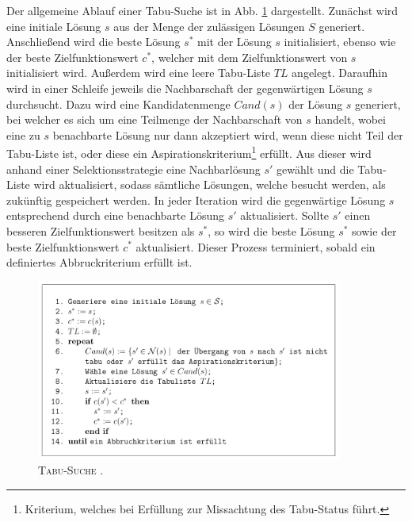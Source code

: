 Der allgemeine Ablauf einer Tabu-Suche ist in Abb. \ref{fig:tabu_search_algo}
dargestellt. Zunächst wird eine initiale Lösung $s$ aus der Menge der zulässigen Lösungen $S$ generiert.
Anschließend wird die beste Lösung $s^*$ mit der Lösung $s$ initialisiert, ebenso wie der beste Zielfunktionswert
$c^*$, welcher mit dem Zielfunktionswert von $s$ initialisiert wird. Außerdem wird eine leere Tabu-Liste $TL$
angelegt. Daraufhin wird in einer Schleife jeweils die Nachbarschaft der gegenwärtigen Lösung $s$ durchsucht. Dazu wird eine
Kandidatenmenge $Cand(s)$ der Lösung $s$ generiert, bei welcher es sich um eine Teilmenge der Nachbarschaft von $s$
handelt, wobei eine zu $s$ benachbarte Lösung nur dann akzeptiert wird, wenn diese nicht Teil der Tabu-Liste ist,
oder diese ein Aspirationskriterium\footnote{Kriterium, welches bei Erfüllung zur Missachtung des Tabu-Status führt.} erfüllt. Aus dieser wird anhand einer Selektionsstrategie eine Nachbarlösung $s'$ gewählt und die Tabu-Liste wird aktualisiert, sodass sämtliche Lösungen, welche besucht werden, als zukünftig  gespeichert werden. In jeder Iteration wird die gegenwärtige Lösung $s$ entsprechend durch eine benachbarte Lösung $s'$ aktualisiert.
Sollte $s'$ einen besseren Zielfunktionswert besitzen als $s^*$, so wird die beste Lösung $s^*$
sowie der beste Zielfunktionswert $c^*$ aktualisiert. Dieser Prozess terminiert, sobald ein definiertes
Abbruckriterium erfüllt ist.

\begin{figure}[H]
\centering
\includegraphics[width=0.9\textwidth]{img/tabu_search_algo_placeholder.png}
\caption{\textsc{Tabu-Suche \cite{Knust2017}.}}
\label{fig:tabu_search_algo}
\end{figure}


